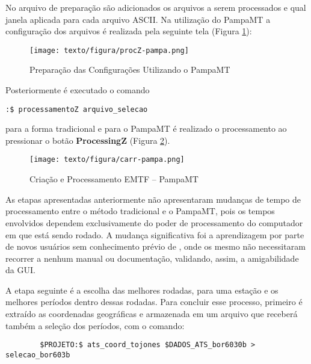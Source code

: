     No arquivo de preparação são adicionados os arquivos a serem processados e qual janela aplicada para cada arquivo ASCII. Na utilização do PampaMT a configuração dos arquivos é realizada pela seguinte tela (Figura \ref{procZ-pampa}):
    
    \begin{figure}[H]
        \caption{Preparação das Configurações Utilizando o PampaMT}
            \begin{center}
                \texttt{[image: texto/figura/procZ-pampa.png]}
            \end{center}
        \legend{\Fonte{\oautor}}
        \label{procZ-pampa}
    \end{figure}
    
    Posteriormente é executado o comando \begin{footnotesize}\verb|:$ processamentoZ arquivo_selecao|\end{footnotesize} para a forma tradicional e para o PampaMT é realizado o processamento ao pressionar o botão \textbf{ProcessingZ} (Figura \ref{carr-pampa}).
    
    \begin{figure}[H]
        \caption{Criação e Processamento EMTF -- PampaMT}
            \begin{center}
                \texttt{[image: texto/figura/carr-pampa.png]}
            \end{center}
        \legend{\Fonte{\oautor}}
        \label{carr-pampa}
    \end{figure}
    
    As etapas apresentadas anteriormente não apresentaram mudanças de tempo de processamento entre o método tradicional e o PampaMT, pois os tempos envolvidos dependem exclusivamente do poder de processamento do computador em que está sendo rodado. A mudança significativa foi a aprendizagem por parte de novos usuários sem conhecimento prévio de , onde os mesmo não necessitaram recorrer a nenhum manual ou documentação, validando, assim, a amigabilidade da GUI. 
    
    A etapa seguinte é a escolha das melhores rodadas, para uma estação e os melhores períodos dentro dessas rodadas. Para concluir esse processo, primeiro é extraído as coordenadas geográficas e armazenada em um arquivo que receberá também a seleção dos períodos, com o comando:
    
        \begin{footnotesize}        
\begin{verbatim}
        $PROJETO:$ ats_coord_tojones $DADOS_ATS_bor6030b > selecao_bor603b
\end{verbatim}
\end{footnotesize}

